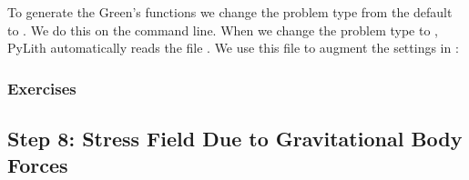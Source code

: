 To generate the Green's functions we change the problem type from the
default  to . We do this
on the command line. When we change the problem type to
, PyLith automatically reads the file
. We use this file to augment the settings in
:








\subsubsection{Exercises}


\subsection{Step 8: Stress Field Due to Gravitational Body Forces}


